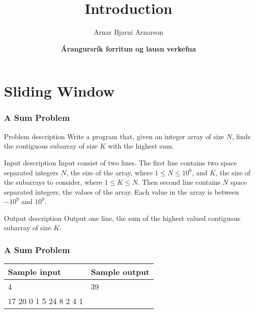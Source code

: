 \documentclass{beamer}
\title{Introduction}
\author{Arnar Bjarni Arnarson}
\institute{\href{http://ru.is/td}{School of Computer Science} \\[2pt] \href{http://ru.is}{Reykjavík University}}
\date{\textbf{Árangursrík forritun og lausn verkefna}}
\begin{document}
\begin{frame}[plain]
    \titlepage
\end{frame}

\section*{Sliding Window}

\begin{frame}[plain]
	\frametitle{A Sum Problem}
	\begin{block}{Problem description}
    	    Write a program that, given an integer array of size $N$, finds the
            contiguous subarray of size $K$ with the highest sum.
    \end{block}

    \vspace{10pt}
    
    \begin{block}{Input description}
            Input consist of two lines.
            The first line contains two space separated integers $N$, the size of the array, where $1 \leq N \leq 10^6$,
    and $K$, the size of the subarrays to consider, where $1 \leq K \leq N$.
            Then second line contains $N$ space separated integers, the values of the array.
            Each value in the array is between $-10^9$  and $10^9$.
    \end{block}

    \vspace{10pt}
    
    \begin{block}{Output description}
            Output one line, the sum of the highest valued contiguous subarray of size $K$.
    \end{block}
\end{frame}

\begin{frame}[plain]
	\frametitle{A Sum Problem}
	\begin{center}
		\begin{tabular}{|l|l|}
            \hline
            {\footnotesize Sample input} & {\footnotesize Sample output} \\
            \hline
            \ttfamily
            10 4 & 39 \\
            17 20 0 1 5 24 8 2 4 1 &  \\
            \hline
        \end{tabular}
    \end{center}
\end{frame}
\end{document}
